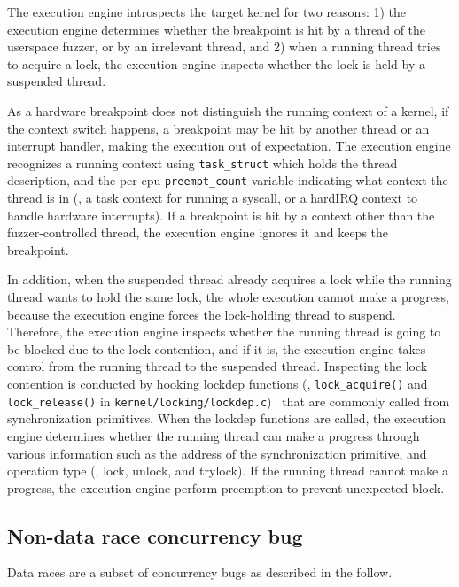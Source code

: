 The execution engine introspects the target kernel for two reasons: 1)
the execution engine determines whether the breakpoint is hit by a
thread of the userspace fuzzer, or by an irrelevant thread, and 2)
when a running thread tries to acquire a lock, the execution engine
inspects whether the lock is held by a suspended thread.

As a hardware breakpoint does not distinguish the running context of a
kernel, if the context switch happens, a breakpoint may be hit by
another thread or an interrupt handler, making the execution out of
expectation.
%
The execution engine recognizes a running context using
\texttt{task_struct} which holds the thread description, and the
per-cpu \texttt{preempt_count} variable indicating what context the
thread is in (\eg, a task context for running a syscall, or a hardIRQ
context to handle hardware interrupts).
%
If a breakpoint is hit by a context other than the fuzzer-controlled
thread, the execution engine ignores it and keeps the breakpoint.


In addition, when the suspended thread already acquires a lock while
the running thread wants to hold the same lock, the whole execution
cannot make a progress, because the execution engine forces the
lock-holding thread to suspend.
%
Therefore, the execution engine inspects whether the running thread is
going to be blocked due to the lock contention, and if it is, the
execution engine takes control from the running thread to the
suspended thread.
%
Inspecting the lock contention is conducted by hooking lockdep
functions (\ie, \texttt{lock_acquire()} and \texttt{lock_release()} in
\texttt{kernel/locking/lockdep.c})~\cite{lockdep} that are commonly
called from synchronization primitives.
%
When the lockdep functions are called, the execution engine determines
whether the running thread can make a progress through various
information such as the address of the synchronization primitive, and
operation type (\ie, lock, unlock, and trylock).
%
If the running thread cannot make a progress, the execution engine
perform preemption to prevent unexpected block.

\subsection{Non-data race concurrency bug}
\label{s:appendix:datarace}

Data races are a subset of concurrency bugs as described in the
follow.


